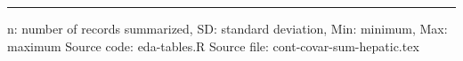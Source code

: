 \vskip 0.67cm
\begin{minipage}{1\linewidth}
\linespread{1.1}\selectfont
\rule{1\linewidth}{0.4pt}
\vskip 0.02cm
n: number of records summarized,
                 SD: standard deviation,
                 Min: minimum, Max: maximum \newline
Source code: eda-tables.R \newline
Source file: cont-covar-sum-hepatic.tex \newline
\end{minipage}
